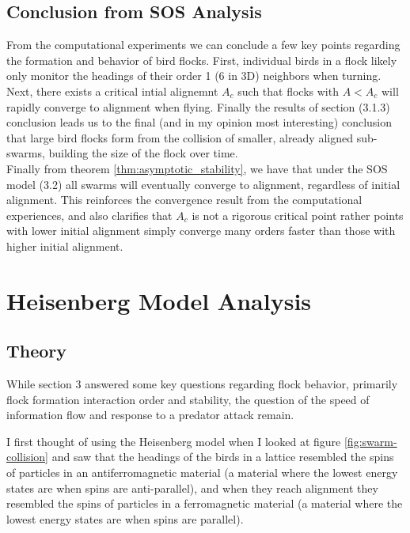\documentclass[11pt,a4paper]{article}
\numberwithin{equation}{section}
\theoremstyle{definition}
\theoremstyle{assumption}
\begin{document}
\subsection{Conclusion from SOS Analysis}
From the computational experiments we can conclude a few key points regarding the formation and behavior of 
bird flocks. First, individual birds in a flock likely only monitor the headings of their order 1 ($6$ in 3D) neighbors when 
turning. Next, there exists a critical intial alignemnt $A_c$ such that flocks with $A<A_c$ will rapidly 
converge to alignment when flying. Finally the results of section (3.1.3) conclusion leads us to the final (and in my opinion most interesting) conclusion
that large bird flocks form from the collision of smaller, already aligned sub-swarms, building the size of the flock over time. 
\\

Finally from theorem \ref{thm:asymptotic_stability}, we have that under the SOS model (3.2) all swarms will eventually converge to alignment, 
regardless of initial alignment. This reinforces the convergence result from the computational experiences, and also clarifies
that $A_c$ is not a rigorous critical point rather points with lower initial alignment simply converge many orders faster than those with higher initial alignment.


\section{Heisenberg Model Analysis}
\subsection{Theory}
While section 3 answered some key questions regarding flock behavior, primarily 
flock formation interaction order and stability, the question of the speed of information
flow and response to a predator attack remain. 

I first thought of using the Heisenberg model when I looked at figure \ref{fig:swarm-collision} and saw that
the headings of the birds in a lattice resembled the spins of particles in an antiferromagnetic material 
(a material where the lowest energy states are when spins are anti-parallel), and when they reach 
alignment they resembled the spins of particles in a ferromagnetic material (a material where the lowest energy states are when spins are parallel).
\\
\end{document}
